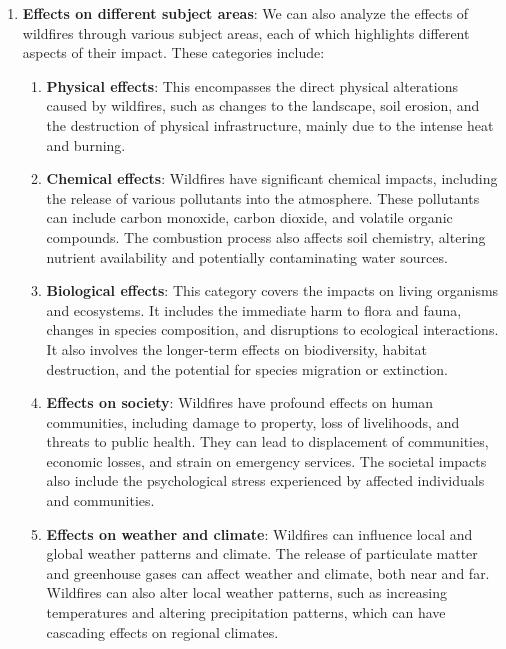 \documentclass[
  12 pt,
]{Nemilov}
\begin{document}
\begin{enumerate}
\def\labelenumi{\arabic{enumi}.}
\setcounter{enumi}{1}
\item
  \textbf{Effects on different subject areas}: We can also analyze the effects of wildfires through various subject areas, each of which highlights different aspects of their impact. These categories include:

  \begin{enumerate}
  \def\labelenumii{\alph{enumii}.}
  \item
    \textbf{Physical effects}: This encompasses the direct physical alterations caused by wildfires, such as changes to the landscape, soil erosion, and the destruction of physical infrastructure, mainly due to the intense heat and burning.
  \item
    \textbf{Chemical effects}: Wildfires have significant chemical impacts, including the release of various pollutants into the atmosphere. These pollutants can include carbon monoxide, carbon dioxide, and volatile organic compounds. The combustion process also affects soil chemistry, altering nutrient availability and potentially contaminating water sources.
  \item
    \textbf{Biological effects}: This category covers the impacts on living organisms and ecosystems. It includes the immediate harm to flora and fauna, changes in species composition, and disruptions to ecological interactions. It also involves the longer-term effects on biodiversity, habitat destruction, and the potential for species migration or extinction.
  \item
    \textbf{Effects on society}: Wildfires have profound effects on human communities, including damage to property, loss of livelihoods, and threats to public health. They can lead to displacement of communities, economic losses, and strain on emergency services. The societal impacts also include the psychological stress experienced by affected individuals and communities.
  \item
    \textbf{Effects on weather and climate}: Wildfires can influence local and global weather patterns and climate. The release of particulate matter and greenhouse gases can affect weather and climate, both near and far. Wildfires can also alter local weather patterns, such as increasing temperatures and altering precipitation patterns, which can have cascading effects on regional climates.
  \end{enumerate}
\end{enumerate}
\end{document}
